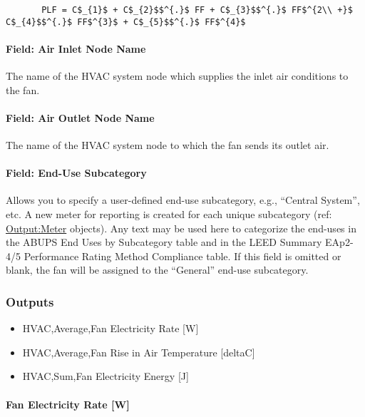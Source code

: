 \begin{lstlisting}
       PLF = C$_{1}$ + C$_{2}$$^{.}$ FF + C$_{3}$$^{.}$ FF$^{2\\ +}$ C$_{4}$$^{.}$ FF$^{3}$ + C$_{5}$$^{.}$ FF$^{4}$
\end{lstlisting}

\paragraph{Field: Air Inlet Node Name}\label{field-air-inlet-node-name-2-000}

The name of the HVAC system node which supplies the inlet air conditions to the fan.

\paragraph{Field: Air Outlet Node Name}\label{field-air-outlet-node-name-2-000}

The name of the HVAC system node to which the fan sends its outlet air.

\paragraph{Field: End-Use Subcategory}

Allows you to specify a user-defined end-use subcategory, e.g., ``Central System'', etc. A new meter for reporting is created for each unique subcategory (ref: \hyperref[outputmeter-and-outputmetermeterfileonly]{Output:Meter} objects). Any text may be used here to categorize the end-uses in the ABUPS End Uses by Subcategory table and in the LEED Summary EAp2-4/5 Performance Rating Method Compliance table. If this field is omitted or blank, the fan will be assigned to the ``General'' end-use subcategory.

\subsubsection{Outputs}\label{outputs-2-009}

\begin{itemize}
\item
  HVAC,Average,Fan Electricity Rate {[}W{]}
\item
  HVAC,Average,Fan Rise in Air Temperature {[}deltaC{]}
\item
  HVAC,Sum,Fan Electricity Energy {[}J{]}
\end{itemize}

\paragraph{Fan Electricity Rate {[}W{]}}\label{fan-electric-power-w-2}


